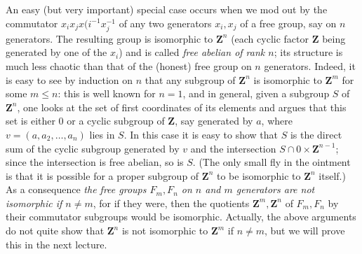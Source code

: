 \documentclass[10pt]{article}
\begin{document}
 An easy (but very important) special case occurs when we mod out by the
 commutator $x_i x_j x(i^{-1} x_j^{-1}$ of any two generators $x_i,x_j$
 of a free group, say on $n$ generators. The resulting group is
 isomorphic to $\mathbf{Z}^n$ (each cyclic factor $\mathbf{Z}$ being
 generated by one of the $x_i$) and is called {\sl free abelian of rank
   $n$}; its structure is much less chaotic than that of the (honest)
 free group on $n$ generators. Indeed, it is easy to see by induction on
 $n$ that any subgroup of $\mathbf{Z}^n$ is isomorphic to $\mathbf{Z}^m$
 for some $m\le n$: this is well known for $n=1$, and in general, given
 a subgroup $S$ of $\mathbf{Z}^n$, one looks at the set of first
 coordinates of its elements and argues that this set is either 0 or a
 cyclic subgroup of $\mathbf{Z}$, say generated by $a$, where
 $v=(a,a_2,\ldots,a_n)$ lies in $S$. In this case it is easy to show
 that $S$ is the direct sum of the cyclic subgroup generated by $v$ and
 the intersection $S\cap 0\times \mathbf{Z}^{n-1}$; since the
 intersection is free abelian, so is $S$. (The only small fly in the
 ointment is that it is possible for a proper subgroup of $\mathbf{Z}^n$
 to be isomorphic to $\mathbf{Z}^n$ itself.) As a consequence {\sl the
   free groups $F_m,F_n$ on $n$ and $m$ generators are not isomorphic if
   $n\ne m$}, for if they were, then the quotients
 $\mathbf{Z}^m,\mathbf{Z}^n$ of $F_m,F_n$ by their commutator subgroups
 would be isomorphic. Actually, the above arguments do not quite show
 that $\mathbf{Z}^n$ is not isomorphic to $\mathbf{Z}^m$ if $n\ne m$,
 but we will prove this in the next lecture.
\end{document}
